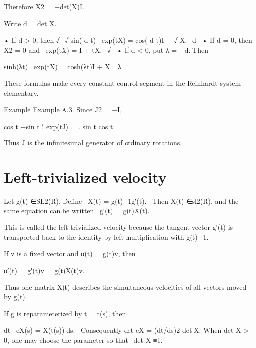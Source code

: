 Therefore X2 = −det(X)I.


Write d = det X.


\begin{displaytext}
• If d > 0, then √ \
√ sin( d t) \
exp(tX) = cos( d t)I + √ X. \
d \
• If d = 0, then X2 = 0 and \
exp(tX) = I + tX. \
√ \
• If d < 0, put λ = −d. Then
\end{displaytext}

\begin{displaytext}
sinh(λt) \
exp(tX) = cosh(λt)I + X. \
λ
\end{displaytext}

These formulas make every constant-control segment in the Reinhardt system elementary.


\begin{statementbox}{Example}
Example A.3. Since J2 = −I,
\end{statementbox}

cos t −sin t ! exp(tJ) = . sin t cos t


Thus J is the infinitesimal generator of ordinary rotations.


\section{Left-trivialized velocity}

\begin{displaytext}
Let g(t) ∈SL2(R). Define \
X(t) = g(t)−1g′(t). \
Then X(t) ∈sl2(R), and the same equation can be written \
g′(t) = g(t)X(t).
\end{displaytext}

This is called the left-trivialized velocity because the tangent vector g′(t) is transported back to the identity by left multiplication with g(t)−1.


\begin{displaytext}
If v is a fixed vector and σ(t) = g(t)v, then
\end{displaytext}

\begin{displaytext}
σ′(t) = g′(t)v = g(t)X(t)v.
\end{displaytext}

Thus one matrix X(t) describes the simultaneous velocities of all vectors moved by g(t).


If g is reparameterized by t = t(s), then


\begin{displaytext}
dt \
eX(s) = X(t(s)) ds. \
Consequently det eX = (dt/ds)2 det X. When det X > 0, one may choose the parameter so that \
det X ≡1.
\end{displaytext}

